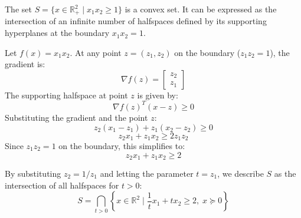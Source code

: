 \documentclass{article}
\begin{document}
The set $S = \{x \in \mathbb{R}^2_+ \mid x_1 x_2 \ge 1\}$ is a  convex set. It can be expressed as the intersection of an infinite number of halfspaces defined by its supporting hyperplanes at the boundary $x_1 x_2 = 1$.

Let $f(x) = x_1 x_2$. At any point $z = (z_1, z_2)$ on the boundary ($z_1 z_2 = 1$), the gradient is:
\[ \nabla f(z) = \begin{bmatrix} z_2 \\ z_1 \end{bmatrix} \]
The supporting halfspace at point $z$ is given by:
\[ \nabla f(z)^T (x - z) \ge 0 \]
Substituting the gradient and the point $z$:
\[ z_2(x_1 - z_1) + z_1(x_2 - z_2) \ge 0 \]
\[ z_2 x_1 + z_1 x_2 \ge 2z_1 z_2 \]
Since $z_1 z_2 = 1$ on the boundary, this simplifies to:
\[ z_2 x_1 + z_1 x_2 \ge 2 \]

By substituting $z_2 = 1/z_1$ and letting the parameter $t = z_1$, we describe $S$ as the intersection of all halfspaces for $t > 0$:
\[ S = \bigcap_{t > 0} \left\{ x \in \mathbb{R}^2 \mid \frac{1}{t}x_1 + t x_2 \ge 2, \; x \succeq 0 \right\} \]
\end{document}
